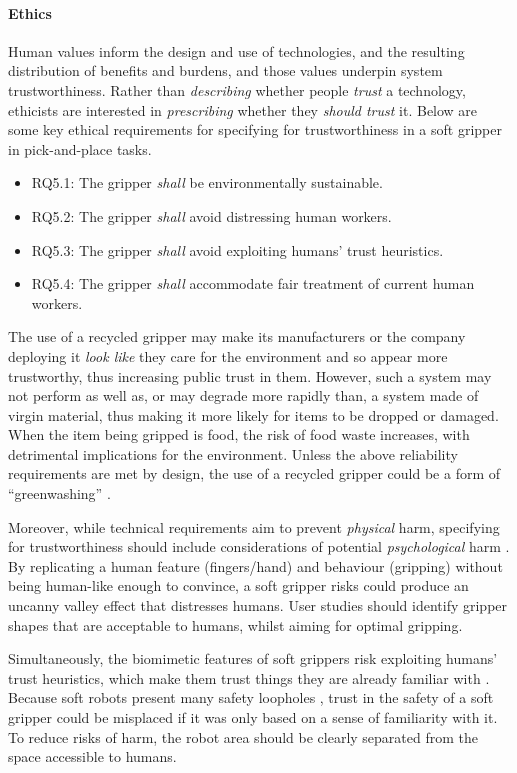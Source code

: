 \documentclass[lettersize,journal]{IEEEtran}
\begin{document}
\paragraph{Ethics}\label{ethics}
Human values inform the design and use of technologies, and the resulting distribution of benefits and burdens, and those values underpin system trustworthiness. Rather than \emph{describing} whether people \emph{trust} a technology, ethicists are interested in \emph{prescribing} whether they \emph{should trust} it. Below are some key ethical requirements for specifying for trustworthiness in a soft gripper in pick-and-place tasks.
\begin{itemize}
	\item RQ5.1: The gripper \emph{shall} 
        be environmentally sustainable. 
        \item RQ5.2: The gripper \emph{shall} avoid distressing human workers.
        \item RQ5.3: The gripper \emph{shall} avoid exploiting humans’ trust heuristics.
        \item RQ5.4: The gripper \emph{shall} accommodate fair treatment of current human workers.
\end{itemize}

The use of a recycled gripper may make its manufacturers or the company deploying it \emph{look like} they care for the environment and so appear more trustworthy, thus increasing public trust in them. However, such a system may not perform as well as, or may degrade more rapidly than, a system made of virgin material, thus making it more likely for items to be dropped or damaged. When the item being gripped is food, the risk of food waste increases, with detrimental implications for the environment. Unless the above reliability requirements are met by design, the use of a recycled gripper could be a form of “greenwashing” \cite{delmas2011drivers}.    

Moreover, while technical requirements aim to prevent \emph{physical} harm, specifying for trustworthiness should include considerations of potential \emph{psychological} harm \cite{Porter2022}. By replicating a human feature (fingers/hand) and behaviour (gripping) without being human-like enough to convince, a soft gripper risks could produce an uncanny valley effect \cite{moore2012bayesian} that distresses humans. User studies should identify gripper shapes that are acceptable to humans, whilst aiming for optimal gripping.  
	
 
Simultaneously, the biomimetic features of soft grippers risk exploiting humans’ trust heuristics, which make them trust things they are already familiar with \cite{Manzini}. Because soft robots present many safety loopholes \cite{abidi2017intrinsic}, trust in the safety of a soft gripper could be misplaced if it was only based on a sense of familiarity with it. To reduce risks of harm, the robot area should be clearly separated from the space accessible to humans.
\end{document}
